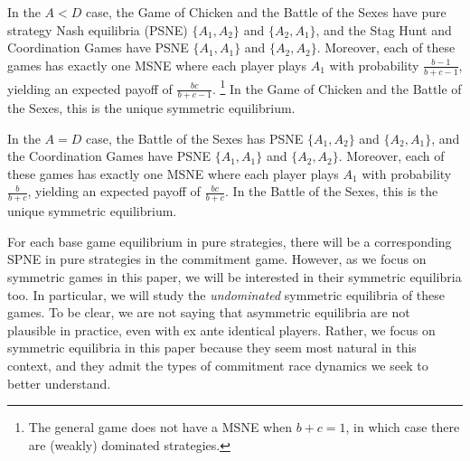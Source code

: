 \documentclass[letterpaper]{article}
\newcommand{\bparam}{b}
\newcommand{\cparam}{c}
\theoremstyle{definition}
\begin{document}
In the $A<D$ case, the Game of Chicken and the Battle of the Sexes have pure strategy Nash equilibria (PSNE) $\{A_1,A_2\}$ and $\{A_2,A_1\}$, and the Stag Hunt and Coordination Games have PSNE $\{A_1,A_1\}$ and $\{A_2,A_2\}$. Moreover, each of these games has exactly one MSNE where each player plays $A_1$ with probability $\frac{\bparam-1}{\bparam+\cparam-1}$, yielding an expected payoff of $\frac{\bparam\cparam}{\bparam+\cparam-1}$. \footnote{The general game does not have a MSNE when $\bparam+\cparam=1$, in which case there are (weakly) dominated strategies.} In the Game of Chicken and the Battle of the Sexes, this is the unique symmetric equilibrium.

In the $A=D$ case, the Battle of the Sexes has PSNE $\{A_1,A_2\}$ and $\{A_2,A_1\}$, and the Coordination Games have PSNE $\{A_1,A_1\}$ and $\{A_2,A_2\}$. Moreover, each of these games has exactly one MSNE where each player plays $A_1$ with probability $\frac{\bparam}{\bparam+\cparam}$, yielding an expected payoff of $\frac{\bparam\cparam}{\bparam+\cparam}$. In the Battle of the Sexes, this is the unique symmetric equilibrium.

For each base game equilibrium in pure strategies, there will be a corresponding SPNE in pure strategies in the commitment game. However, as we focus on symmetric games in this paper, we will be interested in their symmetric equilibria too. In particular, we will study the \textit{undominated} symmetric equilibria of these games. To be clear, we are not saying that asymmetric equilibria are not plausible in practice, even with ex ante identical players. Rather, we focus on symmetric equilibria in this paper because they seem most natural in this context, and they admit the types of commitment race dynamics we seek to better understand.




\end{document}
